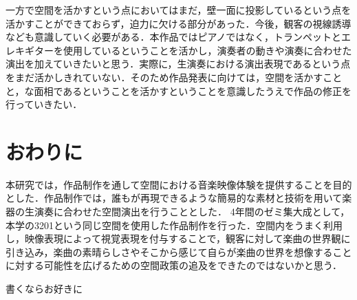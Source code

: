 \documentclass[submit,techrep,noauthor]{ipsj}
\begin{document}
一方で空間を活かすという点においてはまだ，壁一面に投影しているという点を活かすことができておらず，迫力に欠ける部分があった．今後，観客の視線誘導なども意識していく必要がある．本作品ではピアノではなく，トランペットとエレキギターを使用しているということを活かし，演奏者の動きや演奏に合わせた演出を加えていきたいと思う．実際に，生演奏における演出表現であるという点をまだ活かしきれていない．そのため作品発表に向けては，空間を活かすことと，な面相であるということを活かすということを意識したうえで作品の修正を行っていきたい．


\section{おわりに}
本研究では，作品制作を通して空間における音楽映像体験を提供することを目的とした．作品制作では，誰もが再現できるような簡易的な素材と技術を用いて楽器の生演奏に合わせた空間演出を行うこととした． 4年間のゼミ集大成として，本学の3201という同じ空間を使用した作品制作を行った．空間内をうまく利用し，映像表現によって視覚表現を付与することで，観客に対して楽曲の世界観に引き込み，楽曲の素晴らしさやそこから感じて自らが楽曲の世界を想像することに対する可能性を広げるための空間政策の追及をできたのではないかと思う．










\begin{acknowledgment}
	書くならお好きに
\end{acknowledgment}


\end{document}
